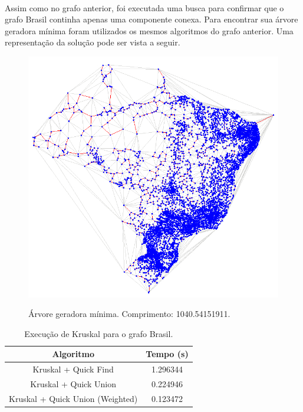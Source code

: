 \documentclass[11pt,a4paper]{article}
\begin{document}
        \paragraph{}
        Assim como no grafo anterior, foi executada uma busca para confirmar que o grafo Brasil continha apenas uma componente conexa.
        Para encontrar sua árvore geradora mínima foram utilizados os mesmos algoritmos do grafo anterior. Uma representação da solução pode ser vista a seguir.
        \newpage

        \begin{figure}[htb!]
          \centering
              \captionsetup{justification=centering}  
              \includegraphics[scale=0.5]{mst_BR}
              \label{fig:mstBR}
              \caption{Árvore geradora mínima. Comprimento: 1040.54151911.}
        \end{figure}

        \begin{table}[htb]
        \centering
            \begin{tabular}{|c|c|}
            \toprule
            Algoritmo                         & Tempo (s)\\
            \midrule
            Kruskal + Quick Find              & 1.296344 \\
            Kruskal + Quick Union             & 0.224946 \\
            Kruskal + Quick Union (Weighted)  & 0.123472 \\
            \bottomrule
            \end{tabular}
            \caption {Execução de Kruskal para o grafo Brasil.}
        \end{table}
\end{document}

